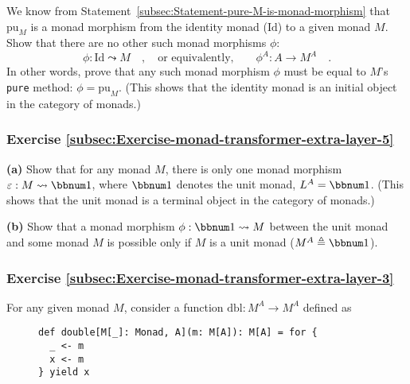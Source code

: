We know from Statement~\ref{subsec:Statement-pure-M-is-monad-morphism}
that $\text{pu}_{M}$ is a monad morphism from the identity monad
($\text{Id}$) to a given monad $M$. Show that there are no other
such monad morphisms $\phi$:
\[
\phi:\text{Id}\leadsto M\quad,\quad\text{or equivalently,}\quad\quad\phi^{A}:A\rightarrow M^{A}\quad.
\]
In other words, prove that any such monad morphism $\phi$ must be
equal to $M$\textsf{'}s \lstinline!pure! method: $\phi=\text{pu}_{M}$. (This
shows that the identity monad is an initial object in the category
of monads.)%
\begin{comment}
Solution:

The identity law of monad morphisms is
\[
\text{pu}_{\text{Id}}\bef\phi=\text{pu}_{M}\quad.
\]
Since $\text{pu}_{\text{Id}}=\text{id}$, we obtain $\phi=\text{pu}_{M}$.
There can be no other monad morphisms $\text{Id}\leadsto M$.
\end{comment}


\subsubsection{Exercise \label{subsec:Exercise-monad-transformer-extra-layer-5}\ref{subsec:Exercise-monad-transformer-extra-layer-5}}

\textbf{(a)} Show that for any monad $M$, there is only one monad
morphism $\varepsilon:M\leadsto\bbnum 1$, where $\bbnum 1$ denotes
the unit monad, $L^{A}=\bbnum 1$. (This shows that the unit monad
is a terminal object in the category of monads.)

\textbf{(b)} Show that a monad morphism $\phi:\bbnum 1\leadsto M$
between the unit monad and some monad $M$ is possible only if $M$
is a unit monad ($M^{A}\triangleq\bbnum 1$).

\subsubsection{Exercise \label{subsec:Exercise-monad-transformer-extra-layer-3}\ref{subsec:Exercise-monad-transformer-extra-layer-3}}

For any given monad $M$, consider a function $\text{dbl}:M^{A}\rightarrow M^{A}$
defined as

\begin{wrapfigure}{l}{0.52\columnwidth}%
\vspace{-0.5\baselineskip}
\begin{lstlisting}
def double[M[_]: Monad, A](m: M[A]): M[A] = for {
  _ <- m
  x <- m
} yield x
\end{lstlisting}

\vspace{-1.5\baselineskip}
\end{wrapfigure}%

